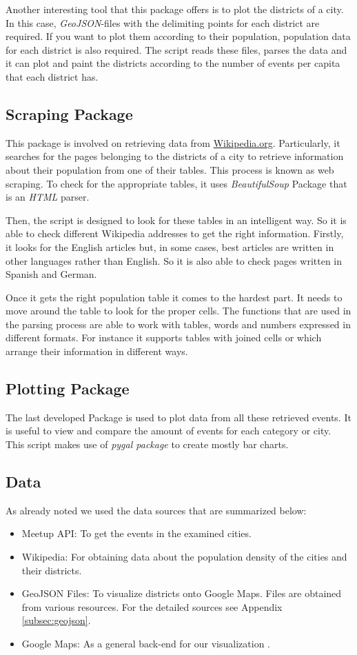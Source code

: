 Another interesting tool that this package offers is to plot the districts of a city. In this case, \emph{GeoJSON}-files with the delimiting points for each district are required. If you want to plot them according to their population, population data for each district is also required. The script reads these files, parses the data and it can plot and paint the districts according to the number of events per capita that each district has.

\subsection*{Scraping Package}
This package is involved on retrieving data from \url{Wikipedia.org}. Particularly, it searches for the pages belonging to the districts of a city to retrieve information about their population from one of their tables. This process is known as web scraping. To check for the appropriate tables, it uses \textit{BeautifulSoup} Package that is an \emph{HTML} parser.

Then, the script is designed to look for these tables in an intelligent way.  So it is able to check different Wikipedia addresses to get the right information.  Firstly, it looks for the English articles but, in some cases, best articles are written in other languages rather than English. So it is also able to check pages written in Spanish and German.

Once it gets the right population table it comes to the hardest part. It needs to move around the table to look for the proper cells. The functions that are used in the parsing process are able to work with tables, words and numbers expressed in different formats. For instance it supports tables with joined cells or which arrange their information in different ways.

\subsection*{Plotting Package}
The last developed Package is used to plot data from all these retrieved events. It is useful to view and compare the amount of events for each category or city. This script makes use of \textit{pygal package} \cite{pygal} to create mostly bar charts. 

\subsection*{Data}

As already noted we used the data sources that are summarized below:

\begin{itemize}
\item Meetup API: To get the events in the examined cities. 
\item Wikipedia: For obtaining data about the population density of the cities and their districts. 
\item GeoJSON Files: To visualize districts onto Google Maps. Files are obtained from various resources. For the detailed sources see Appendix \ref{subsec:geojson}.
\item Google Maps: As a general back-end for our visualization \cite{googlemaps}.
\end{itemize}